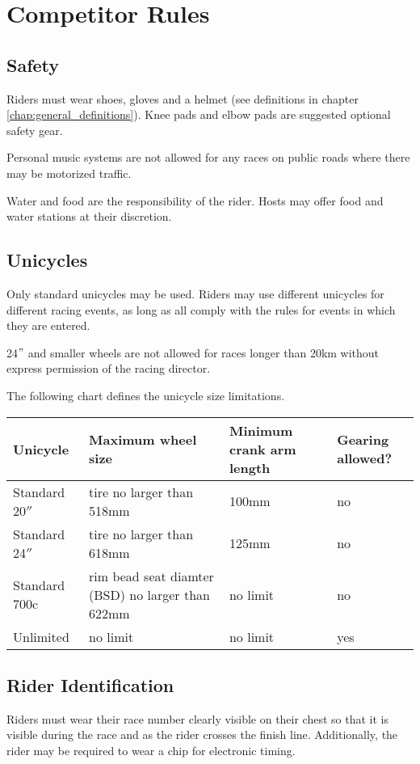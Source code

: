 \chapter{Competitor Rules}

\section{Safety}
Riders must wear shoes, gloves and a helmet (see definitions in chapter \ref{chap:general_definitions}).
Knee pads and elbow pads are suggested optional safety gear.

Personal music systems are not allowed for any races on public roads where there may be motorized traffic.

Water and food are the responsibility of the rider. Hosts may offer food and water stations at their discretion.

\section{Unicycles}

Only standard unicycles may be used.
Riders may use different unicycles for different racing events, as long as all comply with the rules for events in which they are entered.

24$"$ and smaller wheels are not allowed for races longer than 20km without express permission of the racing director.

The following chart defines the unicycle size limitations.
\begin{longtable}{|p{3cm}|p{5cm}|p{2cm}|p{2cm}|}
\hline
\textbf{Unicycle} & \textbf{Maximum wheel size} & \textbf{Minimum crank arm length} & \textbf{Gearing allowed?}\\
\hline
Standard 20$''$ & tire no larger than 518mm & 100mm & no \\
\hline
Standard 24$''$ & tire no larger than 618mm & 125mm & no \\
\hline
Standard 700c & rim bead seat diamter (BSD) no larger than 622mm & no limit & no \\
\hline
Unlimited & no limit & no limit & yes \\
\hline
\end{longtable}

\section{Rider Identification}

Riders must wear their race number clearly visible on their chest so that it is visible during the race and as the rider crosses the finish line.
Additionally, the rider may be required to wear a chip for electronic timing.

